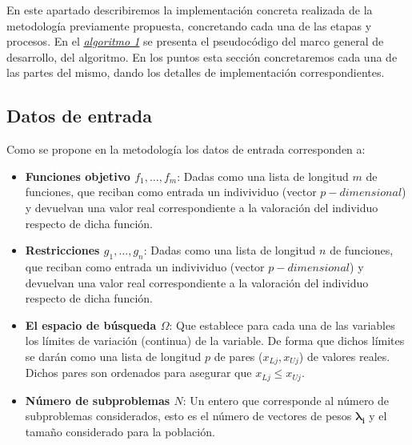 

\justifying
\noindent\begin{minipage}[H]{0.5\linewidth}

En este apartado describiremos la implementación concreta realizada de la metodología previamente propuesta, concretando cada una de las etapas y procesos. En el \hyperref[alg:1]{\textit{algoritmo 1}} se presenta el pseudocódigo del marco general de desarrollo, del algoritmo. En los puntos esta sección concretaremos cada una de las partes del mismo, dando los detalles de implementación correspondientes.\\

\subsection{Datos de entrada}

Como se propone en la metodología los datos de entrada corresponden a:\\

\begin{itemize}
    \item \textbf{Funciones objetivo $f_1, \dots, f_m$}:  Dadas como una lista de longitud $m$ de funciones, que reciban como entrada un indivividuo (vector $p-dimensional$) y devuelvan una valor real correspondiente a la valoración del individuo respecto de dicha función.\\
\end{itemize}

\begin{itemize}
	\item \textbf{Restricciones $g_1, \dots, g_n$}:  Dadas como una lista de longitud $n$ de funciones, que reciban como entrada un indivividuo (vector $p-dimensional$) y devuelvan una valor real correspondiente a la valoración del individuo respecto de dicha función.\\
	
    \item \textbf{El espacio de búsqueda $\Omega$}: Que establece para cada una de las variables los límites de variación (continua) de la variable. De forma que dichos límites se darán como una lista de longitud $p$ de pares ($x_{Lj}, x_{Uj}$) de valores reales. Dichos pares son ordenados para asegurar que $x_{Lj} \leq x_{Uj}$.\\
     
     \item \textbf{Número de subproblemas $N$}: Un entero que corresponde al número de subproblemas considerados, esto es el número de vectores de pesos $\boldsymbol{\lambda_i}$ y el tamaño considerado para la población.\\
     
    
    
\end{itemize} 

\end{minipage} \hfill
